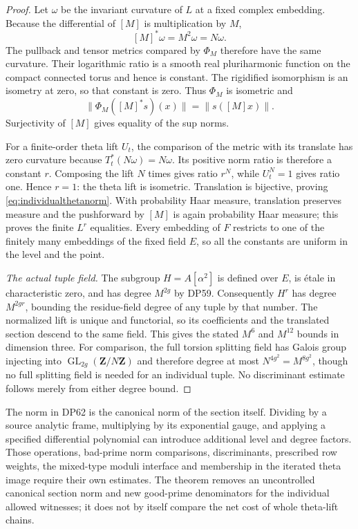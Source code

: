 \documentclass[11pt,a4paper]{article}
\theoremstyle{definition}\newtheorem{remark}[theorem]{Remark}
\begin{document}
\begin{proof}
Let $\omega$ be the invariant curvature of $L$ at a fixed complex embedding.
Because the differential of $[M]$ is multiplication by $M$,
\[
 [M]^*\omega=M^2\omega=N\omega.
\]
The pullback and tensor metrics compared by $\Phi_M$ therefore have the same curvature.
Their logarithmic ratio is a smooth real pluriharmonic function on the compact connected torus and hence is constant.
The rigidified isomorphism is an isometry at zero, so that constant is zero.
Thus $\Phi_M$ is isometric and
\[
 \|\Phi_M([M]^*s)(x)\|=\|s([M]x)\|.
\]
Surjectivity of $[M]$ gives equality of the sup norms.

For a finite-order theta lift $U_t$, the comparison of the metric with its translate has zero curvature because $T_t^*(N\omega)=N\omega$.
Its positive norm ratio is therefore a constant $r$.
Composing the lift $N$ times gives ratio $r^N$, while $U_t^N=1$ gives ratio one.
Hence $r=1$: the theta lift is isometric.
Translation is bijective, proving \eqref{eq:individualthetanorm}.
With probability Haar measure, translation preserves measure and the pushforward by $[M]$ is again probability Haar measure; this proves the finite $L^r$ equalities.
Every embedding of $F$ restricts to one of the finitely many embeddings of the fixed field $E$, so all the constants are uniform in the level and the point.

\emph{The actual tuple field.}
The subgroup $H=A[\alpha^2]$ is defined over $E$, is \'etale in characteristic zero, and has degree $M^{2g}$ by DP59.
Consequently $H^r$ has degree $M^{2gr}$, bounding the residue-field degree of any tuple by that number.
The normalized lift is unique and functorial, so its coefficients and the translated section descend to the same field.
This gives the stated $M^6$ and $M^{12}$ bounds in dimension three.
For comparison, the full torsion splitting field has Galois group injecting into $\operatorname{GL}_{2g}(\mathbf Z/N\mathbf Z)$ and therefore degree at most $N^{4g^2}=M^{8g^2}$, though no full splitting field is needed for an individual tuple.
No discriminant estimate follows merely from either degree bound.
\end{proof}

The norm in DP62 is the canonical norm of the section itself.
Dividing by a source analytic frame, multiplying by its exponential gauge, and applying a specified differential polynomial can introduce additional level and degree factors.
Those operations, bad-prime norm comparisons, discriminants, prescribed row weights, the mixed-type moduli interface and membership in the iterated theta image require their own estimates.
The theorem removes an uncontrolled canonical section norm and new good-prime denominators for the individual allowed witnesses; it does not by itself compare the net cost of whole theta-lift chains.
\end{document}
